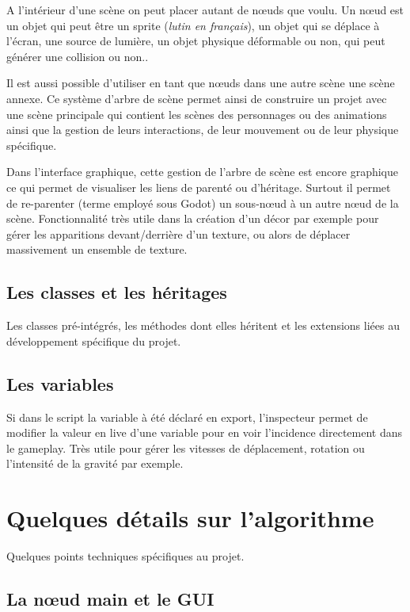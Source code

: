 \documentclass{tstextbook}
\begin{document}
A l'intérieur d'une scène on peut placer autant de nœuds que voulu. Un nœud est un objet qui peut être un sprite (\emph{lutin en français}), un objet qui se déplace à l'écran, une source de lumière, un objet physique déformable ou non, qui peut générer une collision ou non..

Il est aussi possible d'utiliser en tant que nœuds dans une autre scène une scène annexe. Ce système d'arbre de scène permet ainsi de construire un projet avec une scène principale qui contient les scènes des personnages ou des animations ainsi que la gestion de leurs interactions, de leur mouvement ou de leur physique spécifique. 

Dans l'interface graphique, cette gestion de l'arbre de scène est encore graphique ce qui permet de visualiser les liens de parenté ou d'héritage. Surtout il permet de re-parenter (terme employé sous Godot) un sous-nœud à un autre nœud de la scène. Fonctionnalité très utile dans la création d'un décor par exemple pour gérer les apparitions devant/derrière d'un texture, ou alors de déplacer massivement un ensemble de texture.

\section{Les classes et les héritages}

Les classes pré-intégrés, les méthodes dont elles héritent et les extensions liées au développement spécifique du projet.

\section{Les variables}

Si dans le script la variable à été déclaré en export, l'inspecteur permet de modifier la valeur en live d'une variable pour en voir l'incidence directement dans le gameplay. Très utile pour gérer les vitesses de déplacement, rotation ou l'intensité de la gravité par exemple.

	
\chapter{Quelques détails sur l'algorithme}
\begin{summary}
Quelques points techniques spécifiques au projet.
\end{summary}
\section{La nœud main et le GUI}
\end{document}
